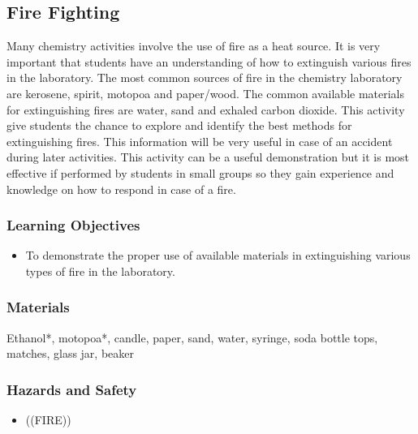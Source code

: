 \subsection{Fire Fighting}
Many chemistry activities involve the use of fire as a heat source. It is very important that students have an understanding of how to extinguish various fires in the laboratory. The most common sources of fire in the chemistry laboratory are kerosene, spirit, motopoa and paper/wood. The common available materials for extinguishing fires are water, sand and exhaled carbon dioxide. This activity give students the chance to explore and identify the best methods for extinguishing fires. This information will be very useful in case of an accident during later activities. This activity can be a useful demonstration but it is most effective if performed by students in small groups so they gain experience and knowledge on how to respond in case of a fire.
\subsubsection*{Learning Objectives}
\begin{itemize}
\item{To demonstrate the proper use of available materials in extinguishing various types of fire in the laboratory.}
\end{itemize}

\subsubsection*{Materials}
Ethanol*, motopoa*, candle, paper, sand, water, syringe, soda bottle tops, matches, glass jar, beaker

\subsubsection*{Hazards and Safety}
\begin{itemize}
\item{((FIRE))}
\end{itemize}


